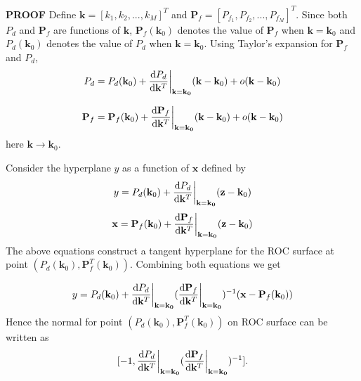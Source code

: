 \noindent\textbf{PROOF}
Define $\mathbf{k} = [k_1, k_2, ..., k_M]^T$ and $\mathbf{P}_f = [P_{f_1}, P_{f_2}, ..., P_{f_M}]^T$. Since both $P_d$ and $\mathbf{P}_f$ are functions of $\mathbf{k}$, $\mathbf{P}_f(\mathbf{k}_0)$ denotes the value of $\mathbf{P}_f$ when $\mathbf{k} = \mathbf{k}_0$ and $P_d(\mathbf{k}_0)$ denotes the value of $P_d$ when $\mathbf{k} = \mathbf{k}_0$. Using Taylor's expansion \cite{zill2011advanced} for $\mathbf{P}_f$ and $P_d$,
\begin{equation}
\label{pro: pd}
P_d = P_d(\mathbf{k}_0) + \frac{\mathrm{d}P_d}{\mathrm{d}\mathbf{k}^T}\bigg{|}_{\mathbf{k}=\mathbf{k_0}}(\mathbf{k} - \mathbf{k}_0)
+ o(\mathbf{k} - \mathbf{k}_0)
\end{equation}

\begin{equation}
\label{pro: pf}
\mathbf{P}_f = \mathbf{P}_f(\mathbf{k}_0) + \frac{\mathrm{d}\mathbf{P}_f}{\mathrm{d}\mathbf{k}^T}\bigg{|}_{\mathbf{k}=\mathbf{k_0}}(\mathbf{k} - \mathbf{k}_0)
+ o(\mathbf{k} - \mathbf{k}_0)
\end{equation}
here $\mathbf{k} \rightarrow \mathbf{k}_0$.

Consider the hyperplane $y$ as a function of $\mathbf{x}$ defined by
\begin{equation}
\label{pro: y}
y = P_d(\mathbf{k}_0) + \frac{\mathrm{d}P_d}{\mathrm{d}\mathbf{k}^T}\bigg{|}_{\mathbf{k}=\mathbf{k_0}}(\mathbf{z} - \mathbf{k}_0)
\end{equation}
\begin{equation}
\label{pro: x}
\mathbf{x} = \mathbf{P}_f(\mathbf{k}_0) + \frac{\mathrm{d}\mathbf{P}_f}{\mathrm{d}\mathbf{k}^T}\bigg{|}_{\mathbf{k}=\mathbf{k_0}}(\mathbf{z} - \mathbf{k}_0)
\end{equation}
The above equations construct a tangent hyperplane for the ROC surface at point $(P_d(\mathbf{k}_0), \mathbf{P}_f^T(\mathbf{k}_0))$. Combining both equations  we get

\begin{equation}
\label{pro : y2}
y = P_d(\mathbf{k}_0) + \frac{\mathrm{d}P_d}{\mathrm{d}\mathbf{k}^T}\bigg{|}_{\mathbf{k}=\mathbf{k_0}}(
\frac{\mathrm{d}\mathbf{P}_f}{\mathrm{d}\mathbf{k}^T}\bigg{|}_{\mathbf{k}=\mathbf{k_0}}
)^{-1} (\mathbf{x} - \mathbf{P}_f(\mathbf{k}_0))
\end{equation}
Hence the normal for point $(P_d(\mathbf{k}_0), \mathbf{P}_f^T(\mathbf{k}_0))$ on ROC surface can be written as
\begin{equation}
\label{vec: normal}
[-1, \frac{\mathrm{d}P_d}{\mathrm{d}\mathbf{k}^T}\bigg{|}_{\mathbf{k}=\mathbf{k_0}}(
\frac{\mathrm{d}\mathbf{P}_f}{\mathrm{d}\mathbf{k}^T}\bigg{|}_{\mathbf{k}=\mathbf{k_0}}
)^{-1}
].
\end{equation}

